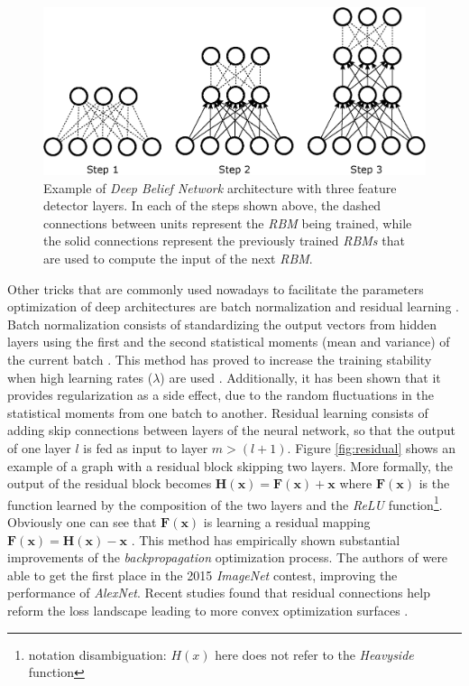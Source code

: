 \begin{figure}
	\centering
	\includegraphics[width=1\linewidth]{chapter2/images/dbn}
	\caption{Example of \textit{Deep Belief Network} architecture with three feature detector layers. In each of the steps shown above, the dashed connections between units represent the \textit{RBM} being trained, while the solid connections represent the previously trained \textit{RBMs} that are used to compute the input of the next \textit{RBM}.}
	\label{fig:dbn}
\end{figure}



Other tricks that are commonly used nowadays to facilitate the parameters optimization of deep architectures are batch normalization \autocite{ioffe2015} and residual learning \autocite{kaiming2016}. Batch normalization consists of standardizing the output vectors from hidden layers using the first and the second statistical moments (mean and variance) of the current batch \autocite{ioffe2015}. This method has proved to increase the training stability when high learning rates ($\lambda$) are used \autocite{Goodfellow2016}. Additionally, it has been shown that it provides regularization \autocite{dauphin2021} as a side effect, due to the random fluctuations in the statistical moments from one batch to another. Residual learning consists of adding skip connections between layers of the neural network, so that the output of one layer $l$ is fed as input to layer $m > (l+1)$. Figure \ref{fig:residual} shows an example of a graph with a residual block skipping two layers. More formally, the output of the residual block becomes $\mathbf{H(x)} = \mathbf{F(x)} + \mathbf{x}$ where $\mathbf{F(x)}$ is the function learned by the composition of the two layers and the \textit{ReLU} function\footnote{notation disambiguation: $H(x)$ here does not refer to the \textit{Heavyside} function}. Obviously one can see that $\mathbf{F(x)}$ is learning a residual mapping $\mathbf{F(x)} = \mathbf{H(x)} - \mathbf{x}$ \autocite{kaiming2016}. This method has empirically shown substantial improvements of the \textit{backpropagation} optimization process. The authors of \autocite{kaiming2016} were able to get the first place in the 2015 \textit{ImageNet} contest, improving the performance of \textit{AlexNet}. Recent studies found that residual connections help reform the loss landscape leading to more convex optimization surfaces \autocite{freeman2017, wang2020a}.


